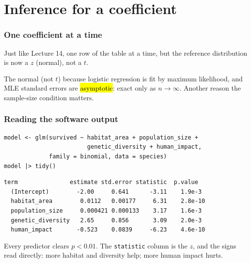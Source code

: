 \documentclass[slidestop,compress,mathserif]{beamer}
\begin{document}
\section{Inference for a coefficient}
\begin{frame}
\frametitle{One coefficient at a time}

Just like Lecture 14, one row of the table at a time, but the reference distribution is now a $z$ (normal), not a $t$.

\pause
\vspace{0.3em}

\pause
\vspace{0.3em}
{\small The normal (not $t$) because logistic regression is fit by maximum likelihood, and MLE standard errors are \hl{asymptotic}: exact only as $n \to \infty$. Another reason the sample-size condition matters.}

\end{frame}


\begin{frame}[fragile]
\frametitle{Reading the software output}

\begin{Verbatim}[fontsize=\small]
model <- glm(survived ~ habitat_area + population_size +
                        genetic_diversity + human_impact,
             family = binomial, data = species)
model |> tidy()
\end{Verbatim}

\pause
\vspace{0.2em}
\begin{Verbatim}[fontsize=\small]
  term               estimate std.error statistic  p.value
  (Intercept)        -2.00     0.641      -3.11    1.9e-3
  habitat_area        0.0112   0.00177     6.31    2.8e-10
  population_size     0.000421 0.000133    3.17    1.6e-3
  genetic_diversity   2.65     0.856       3.09    2.0e-3
  human_impact       -0.523    0.0839     -6.23    4.6e-10
\end{Verbatim}

\pause
\vspace{0.2em}
{\small Every predictor clears $p < 0.01$. The \texttt{statistic} column is the $z$, and the signs read directly: more habitat and diversity help; more human impact hurts.}

\end{frame}
\end{document}
